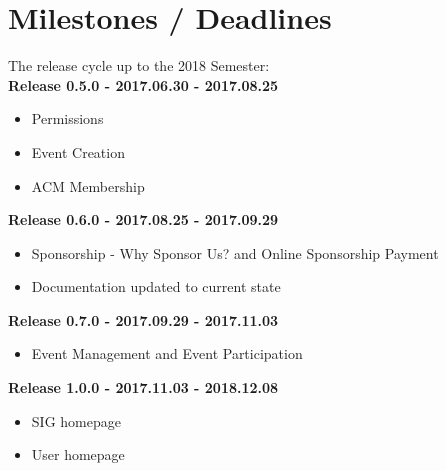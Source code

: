 \documentclass{article}
\begin{document}
\section{Milestones / Deadlines}
The release cycle up to the 2018 Semester:
\\
\textbf{Release 0.5.0 - 2017.06.30 - 2017.08.25}
\begin{itemize}
    \item Permissions
    \item Event Creation
    \item ACM Membership
\end{itemize}
\textbf{Release 0.6.0 - 2017.08.25 - 2017.09.29}
\begin{itemize}
    \item Sponsorship - Why Sponsor Us? and Online Sponsorship Payment
    \item Documentation updated to current state
\end{itemize}
\textbf{Release 0.7.0 - 2017.09.29 - 2017.11.03}
\begin{itemize}
    \item Event Management and Event Participation 
\end{itemize}
\textbf{Release 1.0.0 - 2017.11.03 - 2018.12.08}
\begin{itemize}
    \item SIG homepage 
    \item User homepage
\end{itemize}
\end{document}
